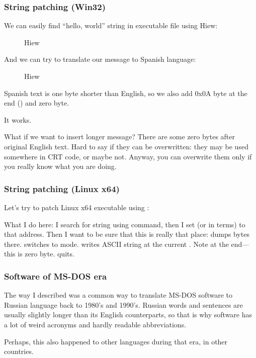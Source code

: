 \subsubsection{String patching (Win32)}

We can easily find ``hello, world'' string in executable file using Hiew:

\begin{figure}[H]
\centering
{}
\caption{Hiew}
\label{}
\end{figure}

And we can try to translate our message to Spanish language:

\begin{figure}[H]
\centering
{}
\caption{Hiew}
\label{}
\end{figure}

Spanish text is one byte shorter than English, so we also add 0x0A byte at the end () and zero byte.

It works.

What if we want to insert longer message?
There are some zero bytes after original English text.
Hard to say if they can be overwritten: they may be used somewhere in \ac{CRT} code, or maybe not.
Anyway, you can overwrite them only if you really know what you are doing.

\subsubsection{String patching (Linux x64)}

\myindex{\radare}
Let's try to patch Linux x64 executable using \radare{}:



What I do here: I search for  string using \TT{/} command, 
then I set  (or  in \radare{} terms) to that address.
Then I want to be sure that this is really that place:  dumps bytes there.
 switches \radare{} to  mode.
 writes ASCII string at the current .
Note  at the end---this is zero byte.
 quits.

\subsubsection{Software  of MS-DOS era}

The way I described was a common way to translate MS-DOS software to Russian language back to 1980's and 1990's.
Russian words and sentences are usually slightly longer than its English counterparts, so that is why 
software has a lot of weird acronyms and hardly readable abbreviations.

Perhaps, this also happened to other languages during that era, in other countries.

